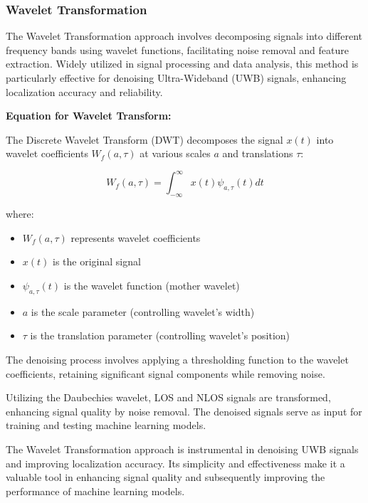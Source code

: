 \subsubsection{Wavelet Transformation}\label{wavelet_transformation}

The Wavelet Transformation approach involves decomposing signals into different frequency bands using wavelet functions, facilitating noise removal and feature extraction. Widely utilized in signal processing and data analysis, this method is particularly effective for denoising Ultra-Wideband (UWB) signals, enhancing localization accuracy and reliability.

\textbf{Equation for Wavelet Transform:}

The Discrete Wavelet Transform (DWT) decomposes the signal $x(t)$ into wavelet coefficients $W_f(a, \tau)$ at various scales $a$ and translations $\tau$:

\begin{equation}
W_f(a, \tau) = \int_{-\infty}^{\infty} x(t) \psi_{a, \tau}(t) dt
\end{equation}

where:

\begin{itemize}
  \item $W_f(a, \tau)$ represents wavelet coefficients
  \item $x(t)$ is the original signal
  \item $\psi_{a, \tau}(t)$ is the wavelet function (mother wavelet)
  \item $a$ is the scale parameter (controlling wavelet's width)
  \item $\tau$ is the translation parameter (controlling wavelet's position)
\end{itemize}

The denoising process involves applying a thresholding function to the wavelet coefficients, retaining significant signal components while removing noise.

Utilizing the Daubechies wavelet, LOS and NLOS signals are transformed, enhancing signal quality by noise removal. The denoised signals serve as input for training and testing machine learning models.

The Wavelet Transformation approach is instrumental in denoising UWB signals and improving localization accuracy. Its simplicity and effectiveness make it a valuable tool in enhancing signal quality and subsequently improving the performance of machine learning models.

